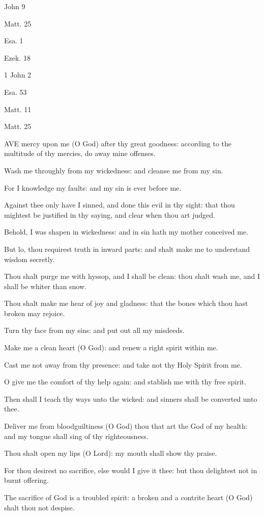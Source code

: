 John 9

Matt. 25

Esa. 1

Ezek. 18

1 John 2

Esa. 53

Matt. 11

Matt. 25

AVE mercy upon me (O God) after
thy great goodness: according to the multitude of thy mercies, do away mine offenses.

Wash me throughly from my wickedness: and cleanse me from my
sin.

For I knowledge my faults: and my sin is ever before me.

Against thee only have I sinned, and done this evil in thy sight: that
thou mightest be justified in thy saying, and clear when thou art judged.

Behold, I was shapen in wickedness: and in sin hath my mother conceived
me.

But lo, thou requirest truth in inward parts: and shalt make
me to understand wisdom secretly.

Thou shalt purge me with hyssop, and I shall be clean: thou shalt wash
me, and I shall be whiter than snow.

Thou shalt make me hear of joy and gladness: that the bones which thou
hast broken may rejoice.

Turn thy face from my sins: and put out all my misdeeds.

Make me a clean heart (O God): and renew a right spirit within me.

Cast me not away from thy presence: and take not thy Holy Spirit from
me.

O give me the comfort of thy help again: and stablish me
with thy free spirit.

Then shall I teach thy ways unto the wicked: and sinners shall be
converted unto thee.

Deliver me from bloodguiltiness (O God) thou that art the God of my
health: and my tongue shall sing of thy righteousness.

Thou shalt open my lips (O Lord): my mouth shall show thy praise.

For thou desirest no sacrifice, else would I give it thee: but thou
delightest not in burnt offering.

The sacrifice of God is a troubled spirit: a broken and a contrite
heart (O God) shalt thou not despise.

